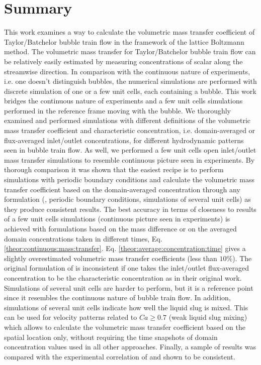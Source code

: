 \documentclass[review,12pt]{elsarticle}
\begin{document}
\section{Summary}
This work examines a way to calculate the volumetric mass transfer coefficient of Taylor/Batchelor bubble train flow in the framework of
the lattice Boltzmann method. {\color{red} The volumetric mass transfer for Taylor/Batchelor bubble train flow can be relatively easily estimated by measuring concentrations of scalar along the streamwise direction. In comparison with the continuous nature of experiments, i.e. one doesn't distinguish bubbles, the numerical simulations are performed with discrete simulation of one or a few unit cells, each containing a bubble. This work bridges the continuous nature of experiments and a few unit cells simulations performed in the reference frame moving with the bubble.  We thoroughly examined and performed simulations with different definitions of the volumetric mass transfer coefficient and characteristic concentration, i.e. domain-averaged or flux-averaged inlet/outlet concentrations, for different hydrodynamic patterns seen in bubble train flow.  As well, we performed a few unit cells open inlet/outlet mass transfer simulations to resemble continuous picture seen in experiments. By thorough comparison it was shown that the easiest recipe is to perform simulations 
with periodic boundary conditions
and calculate the volumetric mass transfer coefficient based on the
domain-averaged concentration through any formulation (\citeauthor{vanbaten-circular}, periodic boundary conditions, simulations of several unit cells) as they produce consistent results. The best accuracy in terms of closeness to results of a few unit cells simulations (continuous picture seen in experiments)
is achieved with formulations based on the mass difference or on the averaged domain concentrations
taken in different times, Eq. \ref{theor:continuous:mass:transfer}. Eq.
\ref{theor:average:concentration:time} gives a slightly overestimated volumetric mass transfer
coefficients (less than $10\%$). The original formulation of
\citet{vanbaten-circular} is inconsistent if one takes the inlet/outlet flux-averaged concentration
to be the characteristic concentration as in their original work. Simulations of several unit cells are harder to perform, but it is a reference point since it resembles the continuous nature of bubble train flow. In addition, simulations of several unit cells 
indicate how well the liquid slug is mixed. This can be used for velocity patterns related to $Ca\geq
0.7$ (weak liquid slug mixing) which allows to calculate the volumetric mass transfer
coefficient based on the spatial location only, without requiring the time snapshots of domain concentration values used in all other
approaches. Finally, a sample of results was
compared with the experimental correlation of \citet{yue-mass} and shown to be consistent. }
\end{document}
